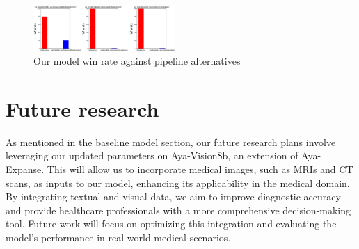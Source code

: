 \documentclass[conference]{IEEEtran}
\begin{document}
\begin{figure}[htbp]
	\centerline{\includegraphics[width=0.48\textwidth]{fig5.png}}
	\caption{Our model win rate against pipeline alternatives}
	\label{fig5}
\end{figure}
\section*{Future research}
As mentioned in the baseline model section, our future research plans involve leveraging our updated parameters on Aya-Vision8b, an extension of Aya-Expanse. This will allow us to incorporate medical images, such as MRIs and CT scans, as inputs to our model, enhancing its applicability in the medical domain. By integrating textual and visual data, we aim to improve diagnostic accuracy and provide healthcare professionals with a more comprehensive decision-making tool. Future work will focus on optimizing this integration and evaluating the model’s performance in real-world medical scenarios.
\end{document}
